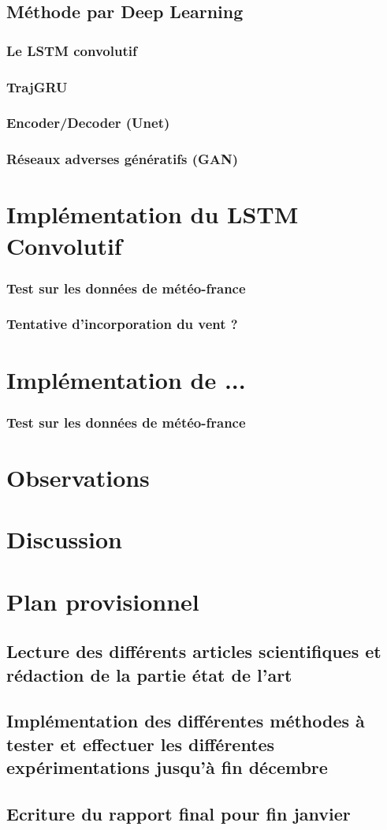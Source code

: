 \documentclass[a4paper]{article}
\begin{document}
\subsection{Méthode par Deep Learning}
\subsubsection{Le LSTM convolutif}
\subsubsection{TrajGRU}
\subsubsection{Encoder/Decoder (Unet)}
\subsubsection{Réseaux adverses génératifs (GAN)}
\section{Implémentation du LSTM Convolutif}
\subsubsection{Test sur les données de météo-france}
\subsubsection{Tentative d'incorporation du vent ?}
\section{Implémentation de ...}
\subsubsection{Test sur les données de météo-france}
\section{Observations}
\section{Discussion}

\nocite{*}

\newpage
\section{Plan provisionnel}
\subsection{Lecture des différents articles scientifiques et rédaction de la partie état de l'art}
\subsection{Implémentation des différentes méthodes à tester et effectuer les différentes expérimentations jusqu'à fin décembre}
\subsection{Ecriture du rapport final pour fin janvier}
\end{document}
